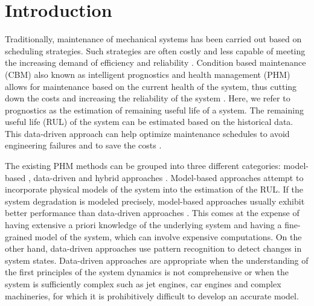 \documentclass[12pt]{IEEEtran}%
\begin{document}
%



\section{Introduction}

\label{sec:rul_intro}

Traditionally, maintenance of mechanical systems has been carried out based on
scheduling strategies. Such strategies are often costly and less capable of
meeting the increasing demand of efficiency and reliability
\cite{Gebraeel2005, Zaidan2013}. Condition based maintenance (CBM) also known
as intelligent prognostics and health management (PHM) allows for maintenance
based on the current health of the system, thus cutting down the costs and increasing
the reliability of the system \cite{Zhao2017}. Here, we refer to prognostics
as the estimation of remaining useful life of a system. The remaining useful life (RUL) of
the system can be estimated based on the historical data. This data-driven
approach can help optimize maintenance schedules to avoid engineering failures
and to save the costs \cite{Lee2014}.

The existing PHM methods can be grouped into three different categories:
model-based \cite{Yu2001}, data-driven \cite{Liu2009, Mosallam2013} and
hybrid approaches \cite{Pecht2010, Liu2012}. Model-based approaches attempt to
incorporate physical models of the system into the estimation of the RUL. If
the system degradation is modeled precisely, model-based approaches usually
exhibit better performance than data-driven approaches \cite{Qian2017}. This
comes at the expense of having extensive a priori knowledge of the underlying
system and having a fine-grained model of the system, which can involve
expensive computations. On the other hand, data-driven approaches use pattern
recognition to detect changes in system states. Data-driven approaches are
appropriate when the understanding of the first principles of the system
dynamics is not comprehensive or when the system is sufficiently complex such as
jet engines, car engines and complex machineries, for which it is prohibitively difficult 
to develop an accurate model.
\end{document}
